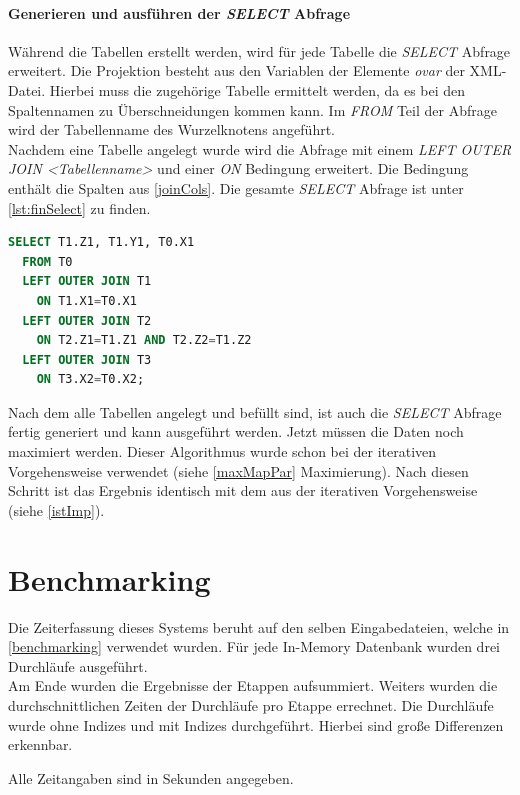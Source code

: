 \documentclass[draft,final]{vutinfth} %
\begin{document}
\paragraph{Generieren und ausführen der \textit{SELECT} Abfrage}
Während die Tabellen erstellt werden, wird für jede Tabelle die \textit{SELECT} Abfrage erweitert. Die Projektion besteht aus den Variablen der Elemente \textit{ovar} der XML-Datei. Hierbei muss die zugehörige Tabelle ermittelt werden, da es bei den Spaltennamen zu Überschneidungen kommen kann. Im \textit{FROM} Teil der Abfrage wird der Tabellenname des Wurzelknotens angeführt. \\
Nachdem eine Tabelle angelegt wurde wird die Abfrage mit einem \textit{LEFT OUTER JOIN <Tabellenname>} und einer \textit{ON} Bedingung erweitert. Die Bedingung enthält die Spalten aus \ref{joinCols}. Die gesamte \textit{SELECT} Abfrage ist unter \ref{lst:finSelect} zu finden.

\begin{lstlisting}[language=SQL,label={lst:finSelect},caption={SELECT Abfrage},frame = single]
SELECT T1.Z1, T1.Y1, T0.X1
  FROM T0
  LEFT OUTER JOIN T1
	ON T1.X1=T0.X1 
  LEFT OUTER JOIN T2
	ON T2.Z1=T1.Z1 AND T2.Z2=T1.Z2 
  LEFT OUTER JOIN T3
	ON T3.X2=T0.X2;
\end{lstlisting}

Nach dem alle Tabellen angelegt und befüllt sind, ist auch die \textit{SELECT} Abfrage fertig generiert und kann ausgeführt werden. Jetzt müssen die Daten noch maximiert werden. Dieser Algorithmus wurde schon bei der iterativen Vorgehensweise verwendet (siehe \ref{maxMapPar} Maximierung). Nach diesen Schritt ist das Ergebnis identisch mit dem aus der iterativen Vorgehensweise (siehe \ref{istImp}).

\section{Benchmarking} \label{benchNeu}
Die Zeiterfassung dieses Systems beruht auf den selben Eingabedateien, welche in \ref{benchmarking} verwendet wurden. Für jede In-Memory Datenbank wurden drei Durchläufe ausgeführt. \\
Am Ende wurden die Ergebnisse der Etappen aufsummiert. Weiters wurden die durchschnittlichen Zeiten der Durchläufe pro Etappe errechnet. Die Durchläufe wurde ohne Indizes und mit Indizes durchgeführt. Hierbei sind gro\ss e Differenzen erkennbar.

Alle Zeitangaben sind in Sekunden angegeben.
\end{document}
